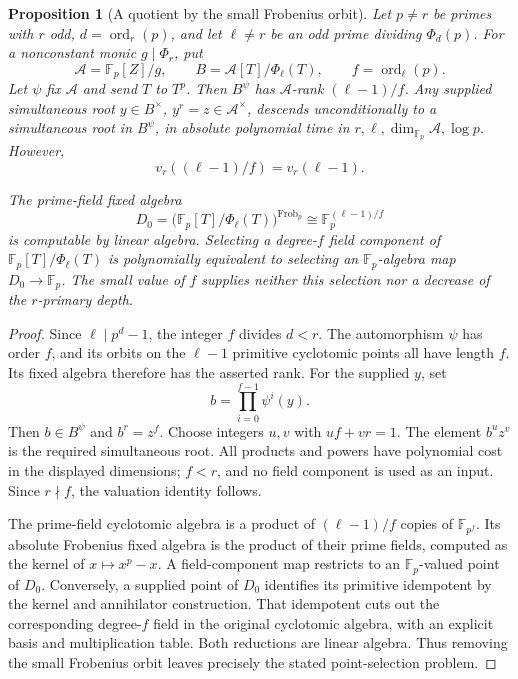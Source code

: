 \documentclass[11pt]{article}
\newtheorem{proposition}[theorem]{Proposition}
\theoremstyle{definition}
\theoremstyle{remark}
\begin{document}
\begin{proposition}[A quotient by the small Frobenius orbit]
\label{prop:small-frobenius-quotient}
Let \(p\ne r\) be primes with \(r\) odd,
\(d=\operatorname{ord}_r(p)\), and let \(\ell\ne r\)
be an odd prime dividing \(\Phi_d(p)\).
For a nonconstant monic \(g\mid\Phi_r\), put
\[
 \mathcal A=\mathbb F_p[Z]/g,\qquad
 B=\mathcal A[T]/\Phi_\ell(T),\qquad
 f=\operatorname{ord}_\ell(p).
\]
Let \(\psi\) fix \(\mathcal A\) and send \(T\) to \(T^p\).
Then \(B^\psi\) has \(\mathcal A\)-rank \((\ell-1)/f\).
Any supplied simultaneous root \(y\in B^\times\),
\(y^r=z\in\mathcal A^\times\), descends unconditionally
to a simultaneous root in \(B^\psi\), in absolute
polynomial time in \(r,\ell,\dim_{\mathbb F_p}\mathcal A,\log p\).
However,
\[
                  v_r((\ell-1)/f)=v_r(\ell-1).
\]

The prime-field fixed algebra
\[
 D_0=
 \bigl(\mathbb F_p[T]/\Phi_\ell(T)\bigr)^{\operatorname{Frob}_p}
       \cong\mathbb F_p^{(\ell-1)/f}
\]
is computable by linear algebra.
Selecting a degree-\(f\) field component of
\(\mathbb F_p[T]/\Phi_\ell(T)\) is polynomially equivalent
to selecting an \(\mathbb F_p\)-algebra map
\(D_0\to\mathbb F_p\).
The small value of \(f\) supplies neither this selection
nor a decrease of the \(r\)-primary depth.
\end{proposition}

\begin{proof}
Since \(\ell\mid p^d-1\), the integer \(f\) divides \(d<r\).
The automorphism \(\psi\) has order \(f\), and its orbits
on the \(\ell-1\) primitive cyclotomic points all have length \(f\).
Its fixed algebra therefore has the asserted rank.
For the supplied \(y\), set
\[
                       b=\prod_{i=0}^{f-1}\psi^i(y).
\]
Then \(b\in B^\psi\) and \(b^r=z^f\).
Choose integers \(u,v\) with \(uf+vr=1\).
The element \(b^u z^v\) is the required simultaneous root.
All products and powers have polynomial cost in the displayed
dimensions; \(f<r\), and no field component is used as an input.
Since \(r\nmid f\), the valuation identity follows.

The prime-field cyclotomic algebra is a product of
\((\ell-1)/f\) copies of \(\mathbb F_{p^f}\).
Its absolute Frobenius fixed algebra is the product of their
prime fields, computed as the kernel of \(x\mapsto x^p-x\).
A field-component map restricts to an \(\mathbb F_p\)-valued
point of \(D_0\).
Conversely, a supplied point of \(D_0\) identifies its primitive
idempotent by the kernel and annihilator construction.
That idempotent cuts out the corresponding degree-\(f\) field
in the original cyclotomic algebra, with an explicit basis
and multiplication table.  Both reductions are linear algebra.
Thus removing the small Frobenius orbit leaves precisely
the stated point-selection problem.
\end{proof}
\end{document}
